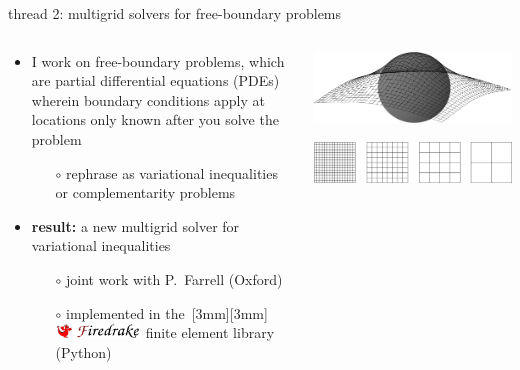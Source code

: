 \documentclass[svgnames,
               hyperref={colorlinks,citecolor=DeepPink4,linkcolor=FireBrick,urlcolor=Maroon},
               usepdftitle=false]  %
               {beamer}
\begin{document}
\begin{frame}{thread 2: multigrid solvers for free-boundary problems}

\begin{columns}
\begin{column}{0.6\textwidth}
\begin{itemize}
\item I work on {\color{FireBrick} free-boundary problems}, which are partial differential equations (PDEs) wherein boundary conditions apply at locations only known after you solve the problem
    \begin{itemize}
    \item[$\circ$] rephrase as variational inequalities or complementarity problems
    \end{itemize}
\item \textbf{result:} a new {\color{FireBrick} multigrid solver} for variational inequalities
    \begin{itemize}
    \item[$\circ$] joint work with P.~Farrell (Oxford)
    \item[$\circ$] implemented in the \,\raisebox{-4pt}[3mm][3mm]{\href{https://www.firedrakeproject.org/index.html}{\includegraphics[width=0.35\textwidth]{figs/firedrakebanner.png}}}\, finite element library (Python)
    \end{itemize}
\end{itemize}
\end{column}
\begin{column}{0.4\textwidth}
{\centering

\includegraphics[width=\textwidth]{figs/obstacle65.pdf}

\vspace{5mm}
\includegraphics[width=\textwidth]{figs/mg-grids.png}

}
\end{column}
\end{columns}
\end{frame}
\end{document}
